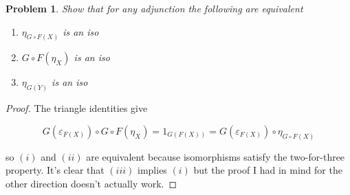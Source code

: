 \documentclass[11pt]{amsart}
\theoremstyle{plain}
\newtheorem{prob}[thm]{Problem}
\theoremstyle{definition}
\newcommand{\vep}{\varepsilon}
\newcommand{\noi}{{\noindent}}
\begin{document}
    \begin{prob}
    Show that for any adjunction the following are equivalent 

    \begin{enumerate}
    \item[$(i)$]$\eta_{G \circ F (X)}$ is an iso
    \item[$(ii)$] $G \circ F (\eta_X)$ is an iso 
    \item[$(iii)$] $\eta_{G(Y)}$ is an iso 
    \end{enumerate}
    \end{prob}
    \begin{proof}
    The triangle identities give 

    \[ G(\vep_{F(X)}) \circ G \circ F(\eta_X) = 1_{G(F(X))} = G(\vep_{F(X)}) \circ \eta_{G\circ F(X)}\]

    \noi so $(i)$ and $(ii)$ are equivalent because isomorphisms satisfy the two-for-three property. It's clear that $(iii)$ implies $(i)$ but the proof I had in mind for the other direction doesn't actually work. 
    
    



    

    \end{proof}
    
\end{document}
